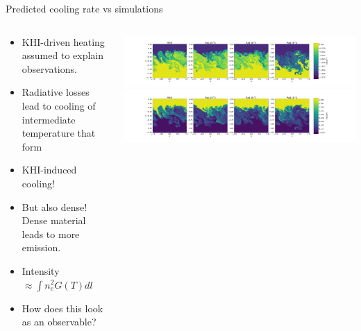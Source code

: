 \documentclass[10pt,aspectratio=169,usenames,dvipsnames]{beamer}
\begin{document}
\begin{frame}{Predicted cooling rate vs simulations}
\begin{columns}
\begin{column}{0.6\textwidth}
\begin{itemize}
    \item KHI-driven heating assumed to explain observations.
    \item Radiative losses lead to cooling of intermediate temperature that form
    \item KHI-induced cooling!
    \item But also dense! Dense material leads to more emission. 
    \item Intensity $\approx \int n_e^2 G(T) dl$
    \item How does this look as an observable?
\end{itemize}
\end{column}
\begin{column}{0.4\textwidth}
   \includegraphics[width=0.99\linewidth,clip=true,trim=58.9cm 0.8cm 8.9cm 0.8cm]{2023Dundee/Figures/denstempevo_T_t0071.png} \\
   \includegraphics[width=0.99\linewidth,clip=true,trim=58.9cm 0.8cm 8.9cm 0.8cm]{2023Dundee/Figures/denstempevo_rho_t0071.png}
\end{column}
\end{columns}
\end{frame}
\end{document}
